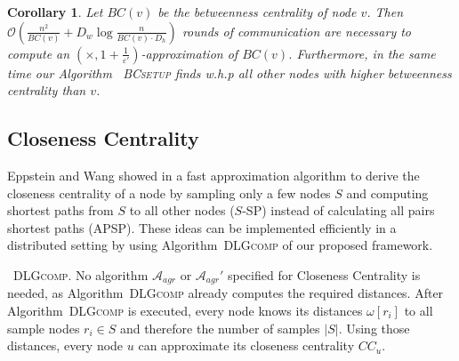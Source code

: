 \documentclass[11pt]{article}
\newcommand{\BO}{\mathcal{O}}
\newtheorem{corollary}[theorem]{Corollary}
\newcommand{\todoI}[1]{}\newcommand{\blueI}[1]{}
\renewcommand{\epsilon}{\varepsilon}
\newif\iffull
\newif\ifshort
\begin{document}
\begin{corollary}
Let $BC(v)$ be the betweenness centrality of node $v$. Then $\BO\left(\frac{n^2}{BC(v)} + D_w\log \frac{n}{BC(v)\cdot D_h}\right)$ rounds of communication are necessary to compute an $\left(\times,1+\frac{1}{\epsilon'}\right)$-approximation of $BC(v)$. Furthermore, in the same time our Algorithm \iffull~\ref{alg:BC_setup_controlling}\fi~\textsc{BCsetup} finds  w.h.p all other nodes with higher betweenness centrality than $v$.
\end{corollary}
\fi 




\subsection{Closeness Centrality}
\label{sec:CC}

\todoI{It is mentioned in \cite{aggarwal2010survey} that a modification of \cite{rattigan2007graph} chooses landmarks using local closeness centrality - can we do that, too?}\blueI{I dont know. Didnt read it}

Eppstein and Wang showed in \cite{eppstein:2001:fastCCapprox} a fast approximation algorithm to derive the closeness centrality of a node by sampling only a few nodes $S$ and computing shortest paths from $S$ to all other nodes ($S$-SP) instead of calculating all pairs shortest paths (APSP).
These ideas can be implemented efficiently in a distributed setting by using Algorithm\iffull~\ref{alg:DLGcomp}\fi~\textsc{DLGcomp} of our proposed framework.
\ifshort 
A detailed description is given in Appendix \ref{FULL:sec:CC}.\\
\fi
\iffull
The Algorithm \ref{alg:CC} first computes $T_1$ with a breath-first-search algorithm starting in node $1$, then the value of $\epsilon$ gets broadcasted through $T_1$ in the network.
When a node has received $\epsilon$, it joins $S$ as a sample node with probability $\frac{log(n)}{n\cdot \epsilon^2}$. The number of nodes joining set $S$ are collected and broadcasted in Lines \ref{line:CCjoinSstart} to \ref{line:CCjoinSend}. In Line \ref{line:CCaccmessages}, if a node $u\in V$ receives multiple messages in one time slot, then in the next time slot node $u$ sends the sum of the values of all messages to its parent in $T_1$.
Now, in line \ref{line:CCexAlg}, each node executes Algorithm\iffull~\ref{alg:DLGcomp}\fi~\textsc{DLGcomp}. No algorithm $\mathcal{A}_{agr}$ or $\mathcal{A}_{agr}'$ 
specified for Closeness Centrality is needed, as Algorithm\iffull~\ref{alg:DLGcomp}\fi~\textsc{DLGcomp} already computes the required distances.
After Algorithm\iffull~\ref{alg:DLGcomp}\fi~\textsc{DLGcomp} is executed, every node knows its distances $\omega[r_i]$ to all sample nodes $r_i\in S$ and therefore the number of samples $|S|$. Using those distances, every node $u$ can approximate its closeness centrality $CC_u$. \blueI{note: no aggregation / Algo2 needed.}
\end{document}
